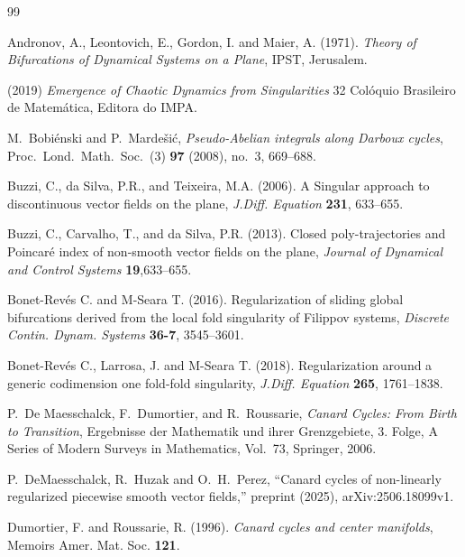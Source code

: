 \documentclass[11pt,psamsfonts]{article}
\theoremstyle{definition}
\theoremstyle{remark}
\begin{document}
\begin{thebibliography}{99}

 {Andronov, A., Leontovich, E., Gordon, I. and Maier, A.} (1971).
\emph{Theory of Bifurcations of Dynamical Systems on a Plane},
IPST, Jerusalem.



(2019)
\emph{Emergence of Chaotic Dynamics from Singularities} 32 Colóquio Brasileiro de Matemática, Editora do IMPA.

M.~Bobi{\'e}nski and P.~Marde{\v{s}}i{\'c},
\emph{Pseudo-Abelian integrals along Darboux cycles},
Proc.\ Lond.\ Math.\ Soc.\ (3) \textbf{97} (2008), no.~3, 669--688.


 {Buzzi, C., da Silva, P.R., and Teixeira, M.A.} (2006).
A Singular approach to discontinuous vector fields on the plane, \textit{J.Diff. Equation} \textbf{231},
 633--655.
 
 {Buzzi, C., Carvalho, T., and da Silva, P.R.} (2013). Closed poly-trajectories and Poincaré 
index of non-smooth vector fields on the plane,
\textit{Journal of Dynamical and Control Systems} \textbf{19},633--655.

 {Bonet-Rev\'{e}s C. and M-Seara T.} (2016).
 Regularization of sliding global bifurcations derived from the local fold singularity of Filippov systems,
\textit{Discrete Contin. Dynam. Systems} \textbf{36-7}, 3545--3601.
 
  {Bonet-Rev\'{e}s C., Larrosa, J.  and M-Seara T.} (2018).
 Regularization around a generic codimension one fold-fold singularity,
 \textit{J.Diff. Equation} \textbf{265}, 1761--1838.
 
P.~De Maesschalck, F.~Dumortier, and R.~Roussarie,
\newblock \emph{Canard Cycles: From Birth to Transition},
\newblock Ergebnisse der Mathematik und ihrer Grenzgebiete, 3. Folge,
A Series of Modern Surveys in Mathematics, Vol.~73,
Springer, 2006.

P.~DeMaesschalck, R.~Huzak and O.~H.~Perez,
\newblock “Canard cycles of non-linearly regularized piecewise smooth vector fields,”
\newblock preprint (2025), arXiv:2506.18099v1.

  {Dumortier, F. and Roussarie, R.} (1996).
 {\it Canard cycles and center manifolds}, Memoirs Amer. Mat. Soc.
 \textbf{121}.
 

\end{thebibliography}
\end{document}
